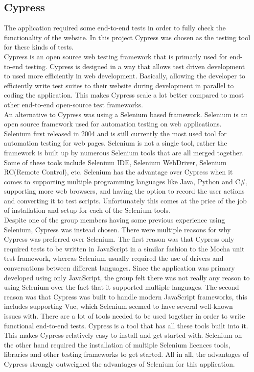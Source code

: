 \subsection{Cypress}
The application required some end-to-end tests in order to fully check the functionality of the website. In this project Cypress was chosen as the testing tool for these kinds of tests.
\\[11pt]
Cypress\cite{Cypress:MainPage,Cypress:howItWorks} is an open source web testing framework that is primarly used for end-to-end testing. Cypress is designed in a way that allows test driven development to used more efficiently in web development. Basically, allowing the developer to efficiently write test suites to their website during development in parallel to coding the application. This makes Cypress scale a lot better compared to most other end-to-end open-source test frameworks.
\\[11pt]
An alternative to Cypress\cite{Selenium:Intro,Selenium:Wiki} was using a Selenium based framework. Selenium is an open source framework used for automation testing on web applications. Selenium first released in 2004 and is still currently the most used tool for automation testing for web pages. Selenium is not a single tool, rather the framework is built up by numerous Selenium tools that are all merged together. Some of these tools include Selenium IDE, Selenium WebDriver, Selenium RC(Remote Control), etc. Selenium has the advantage over Cypress when it comes to supporting multiple programming languages like Java, Python and C\#, supporting more web browsers, and having the option to record the user actions and converting it to test scripts. Unfortunately this comes at the price of the job of installation and setup for each of the Selenium tools.
\\[11pt]
Despite one of the group members having some previous experience using Selenium, Cypress was instead chosen. There were multiple reasons for why Cypress was preferred over Selenium. The first reason was that Cypress only required tests to be written in JavaScript in a similar fashion to the Mocha unit test framework, whereas Selenium usually required the use of drivers and conversations between different languages. Since the application was primary developed using only JavaScript, the group felt there was not really any reason to using Selenium over the fact that it supported multiple languages. The second reason was that Cypress was built to handle modern JavaScript frameworks, this includes supporting Vue, which Selenium seemed to have several well-known issues with. There are a lot of tools needed to be used together in order to write functional end-to-end tests. Cypress is a tool that has all these tools built into it. This makes Cypress relatively easy to install and get started with. Selenium on the other hand required the installation of multiple Selenium licences tools, libraries and other testing frameworks to get started. All in all, the advantages of Cypress strongly outweighed the advantages of Selenium for this application.\cite{CypressVsSelenium}
